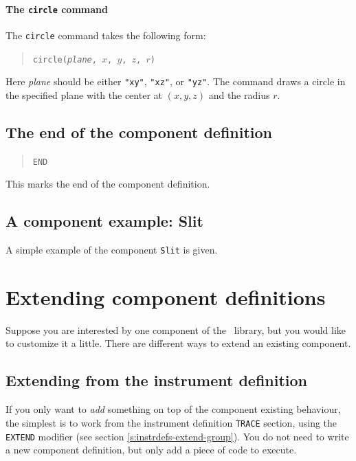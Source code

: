 \paragraph{The {\tt circle} command}

The {\tt circle} command takes the following form:
\begin{quote}
  \texttt{circle({\it plane}, $x$, $y$, $z$, $r$)}
\end{quote}
Here {\it plane} should be either \verb+"xy"+, \verb+"xz"+, or
\verb+"yz"+. The command draws a circle in the specified plane with the center
 at $(x, y, z)$ and the radius $r$.



\subsection{The end of the component definition}

\begin{quote}
  \texttt{END}
\end{quote}
This marks the end of the component definition.

\subsection{A component example: Slit}
\label{s:slit}
A simple example of the component \texttt{Slit} is given.



\section{Extending component definitions}
\label{s:compdefs-extend}

Suppose you are interested by one component of the \MCS\ library, but you would like to customize it a little. There are different ways to extend an existing component.

\subsection{Extending from the instrument definition}

If you only want to \emph{add} something on top of the component existing behaviour, the simplest is to work from the instrument definition \texttt{TRACE} section, using the \texttt{EXTEND} modifier (see section \ref{s:instrdefs-extend-group}). You do not need to write a new component definition, but only add a piece of code to execute.

